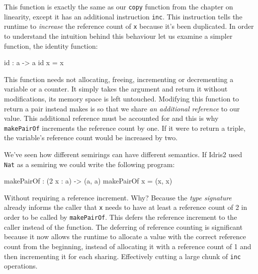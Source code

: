 \documentclass[
]{article}
\newenvironment{Shaded}{}{}
\newcommand{\DecValTok}[1]{\textcolor[rgb]{0.25,0.63,0.44}{#1}}
\newcommand{\FunctionTok}[1]{\textcolor[rgb]{0.02,0.16,0.49}{#1}}
\newcommand{\NormalTok}[1]{#1}
\newcommand{\OperatorTok}[1]{\textcolor[rgb]{0.40,0.40,0.40}{#1}}
\newcommand{\OtherTok}[1]{\textcolor[rgb]{0.00,0.44,0.13}{#1}}
\begin{document}
This function is exactly the same as our \texttt{copy} function from the
chapter on linearity, except it has an additional instruction
\texttt{inc}. This instruction tells the runtime to \emph{increase} the
reference count of \texttt{x} because it's been duplicated. In order to
understand the intuition behind this behaviour let us examine a simpler
function, the identity function:

\begin{Shaded}
\begin{Highlighting}[]
\FunctionTok{id} \OperatorTok{:}\NormalTok{ a }\OtherTok{{-}\textgreater{}}\NormalTok{ a}
\FunctionTok{id}\NormalTok{ x }\OtherTok{=}\NormalTok{ x}
\end{Highlighting}
\end{Shaded}

This function needs not allocating, freeing, incrementing or
decrementing a variable or a counter. It simply takes the argument and
return it without modifications, its memory space is left untouched.
Modifying this function to return a pair instead makes is so that we
share \emph{an additional reference} to our value. This additional
reference must be accounted for and this is why \texttt{makePairOf}
increments the reference count by one. If it were to return a triple,
the variable's reference count would be increased by two.

We've seen how different semirings can have different semantics. If
Idris2 used \texttt{Nat} as a semiring we could write the following
program:

\begin{Shaded}
\begin{Highlighting}[]
\NormalTok{makePairOf }\OperatorTok{:}\NormalTok{ (}\DecValTok{2}\NormalTok{ x }\OperatorTok{:}\NormalTok{ a) }\OtherTok{{-}\textgreater{}}\NormalTok{ (a, a)}
\NormalTok{makePairOf x }\OtherTok{=}\NormalTok{ (x, x)}
\end{Highlighting}
\end{Shaded}

Without requiring a reference increment. Why? Because the \emph{type
signature} already informs the caller that \texttt{x} needs to have at
least a reference count of 2 in order to be called by
\texttt{makePairOf}. This defers the reference increment to the caller
instead of the function. The deferring of reference counting is
significant because it now allows the runtime to allocate a value with
the correct reference count from the beginning, instead of allocating it
with a reference count of 1 and then incrementing it for each sharing.
Effectively cutting a large chunk of \texttt{inc} operations.
\end{document}
